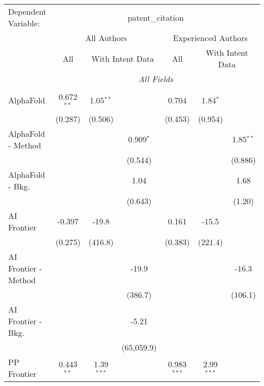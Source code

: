 \begingroup
\centering
\begin{tabular}{lcccccc}
   \tabularnewline \midrule \midrule
   Dependent Variable: & \multicolumn{6}{c}{patent\_citation}\\
 & \multicolumn{3}{c}{All Authors} & \multicolumn{3}{c}{Experienced Authors} \\
\cmidrule(lr){2-4} \cmidrule(lr){5-7}
 & \multicolumn{1}{c}{All} & \multicolumn{2}{c}{With Intent Data} & \multicolumn{1}{c}{All} & \multicolumn{2}{c}{With Intent Data} \\
\cmidrule(lr){2-2} \cmidrule(lr){3-4} \cmidrule(lr){5-5} \cmidrule(lr){6-7}
 & \multicolumn{6}{c}{\textit{All Fields}} \\ \\
   AlphaFold            & 0.672$^{**}$ & 1.05$^{**}$  &              & 0.704         & 1.84$^{*}$   &   \\   
                        & (0.287)      & (0.506)      &              & (0.453)       & (0.954)      &   \\   
   AlphaFold - Method   &              &              & 0.909$^{*}$  &               &              & 1.85$^{**}$\\   
                        &              &              & (0.544)      &               &              & (0.886)\\   
   AlphaFold - Bkg.     &              &              & 1.04         &               &              & 1.68\\   
                        &              &              & (0.643)      &               &              & (1.20)\\   
   AI Frontier          & -0.397       & -19.8        &              & 0.161         & -15.5        &   \\   
                        & (0.275)      & (416.8)      &              & (0.383)       & (221.4)      &   \\   
   AI Frontier - Method &              &              & -19.9        &               &              & -16.3\\   
                        &              &              & (386.7)      &               &              & (106.1)\\   
   AI Frontier - Bkg.   &              &              & -5.21        &               &              &   \\   
                        &              &              & (65,059.9)   &               &              &   \\   
   PP Frontier          & 0.443$^{**}$ & 1.39$^{***}$ &              & 0.983$^{***}$ & 2.99$^{***}$ &   \\   

\end{tabular}

